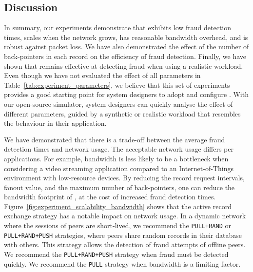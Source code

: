 \subsection{Discussion}
In summary, our experiments demonstrate that \TrustChain{} exhibits low fraud detection times, scales when the network grows, has reasonable bandwidth overhead, and is robust against packet loss.
We have also demonstrated the effect of the number of back-pointers in each record on the efficiency of fraud detection.
Finally, we have shown that \TrustChain{} remains effective at detecting fraud when using a realistic workload.
Even though we have not evaluated the effect of all parameters in Table~\ref{tab:experiment_parameters}, we believe that this set of experiments provides a good starting point for system designers to adopt and configure \TrustChain{}.
With our open-source simulator, system designers can quickly analyse the effect of different parameters, guided by a synthetic or realistic workload that resembles the behaviour in their application.

We have demonstrated that there is a trade-off between the average fraud detection times and network usage.
The acceptable network usage differs per applications.
For example, bandwidth is less likely to be a bottleneck when considering a video streaming application compared to an Internet-of-Things environment with low-resource devices.
By reducing the record request intervals, fanout value, and the maximum number of back-pointers, one can reduce the bandwidth footprint of \TrustChain{}, at the cost of increased fraud detection times.
Figure~\ref{fig:experiment_scalability_bandwidth} shows that the active record exchange strategy has a notable impact on network usage.
In a dynamic network where the sessions of peers are short-lived, we recommend the \texttt{PULL+RAND} or \texttt{PULL+RAND+PUSH} strategies, where peers share random records in their database with others.
This strategy allows the detection of fraud attempts of offline peers.
We recommend the \texttt{PULL+RAND+PUSH} strategy when fraud must  be detected quickly.
We recommend the \texttt{PULL} strategy when bandwidth is a limiting factor.


